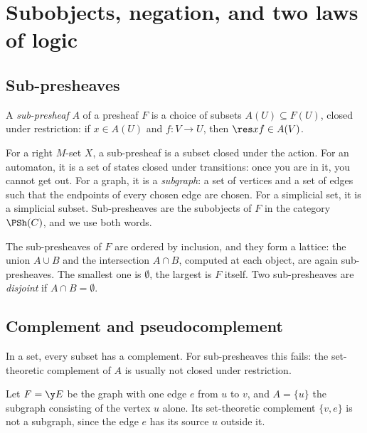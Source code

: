 \section{Subobjects, negation, and two laws of logic}\label{sec:negation}

\subsection{Sub-presheaves}

\begin{definition}
A \emph{sub-presheaf} $A$ of a presheaf $F$ is a choice of subsets $A(U)\subseteq F(U)$, closed under restriction: if $x\in A(U)$ and $f : V\to U$, then $\res xf\in A(V)$.
\end{definition}

For a right $M$-set $X$, a sub-presheaf is a subset closed under the action. For an automaton, it is a set of states closed under transitions: once you are in it, you cannot get out. For a graph, it is a \emph{subgraph}: a set of vertices and a set of edges such that the endpoints of every chosen edge are chosen. For a simplicial set, it is a simplicial subset. Sub-presheaves are the subobjects of $F$ in the category $\PSh(C)$, and we use both words.

The sub-presheaves of $F$ are ordered by inclusion, and they form a lattice: the union $A\cup B$ and the intersection $A\cap B$, computed at each object, are again sub-presheaves. The smallest one is $\emptyset$, the largest is $F$ itself. Two sub-presheaves are \emph{disjoint} if $A\cap B = \emptyset$.

\subsection{Complement and pseudocomplement}

In a set, every subset has a complement. For sub-presheaves this fails: the set-theoretic complement of $A$ is usually not closed under restriction.

\begin{example}\label{ex:edge}
Let $F = \y E$ be the graph with one edge $e$ from $u$ to $v$, and $A = \{u\}$ the subgraph consisting of the vertex $u$ alone. Its set-theoretic complement $\{v, e\}$ is not a subgraph, since the edge $e$ has its source $u$ outside it.
\end{example}


